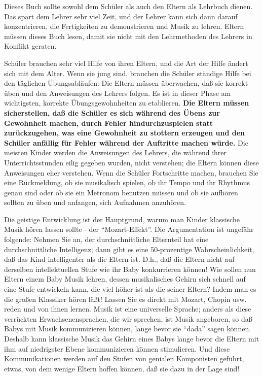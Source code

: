 Dieses Buch sollte sowohl dem Schüler als auch den Eltern als Lehrbuch dienen.
Das spart dem Lehrer sehr viel Zeit, und der Lehrer kann sich dann darauf konzentrieren, die Fertigkeiten zu demonstrieren und Musik zu lehren.
Eltern müssen dieses Buch lesen, damit sie nicht mit den Lehrmethoden des Lehrers in Konflikt geraten.

Schüler brauchen sehr viel Hilfe von ihren Eltern, und die Art der Hilfe ändert sich mit dem Alter.
Wenn sie jung sind, brauchen die Schüler ständige Hilfe bei den täglichen Übungsabläufen: Die Eltern müssen überwachen, daß sie korrekt üben und den Anweisungen des Lehrers folgen.
Es ist in dieser Phase am wichtigsten, korrekte Übungsgewohnheiten zu etablieren.
\textbf{Die Eltern müssen sicherstellen, daß die Schüler es sich während des Übens zur Gewohnheit machen, durch Fehler hindurchzuspielen statt zurückzugehen, was eine Gewohnheit zu stottern erzeugen und den Schüler anfällig für Fehler während der Auftritte machen würde.}
Die meisten Kinder werden die Anweisungen des Lehrers, die während ihrer Unterrichtsstunden eilig gegeben wurden, nicht verstehen; die Eltern können diese Anweisungen eher verstehen.
Wenn die Schüler Fortschritte machen, brauchen Sie eine Rückmeldung, ob sie musikalisch spielen, ob ihr Tempo und ihr Rhythmus genau sind oder ob sie ein Metronom benutzen müssen und ob sie aufhören sollten zu üben und anfangen, sich Aufnahmen anzuhören.

Die geistige Entwicklung ist der Hauptgrund, warum man Kinder klassische Musik hören lassen sollte - der \enquote{Mozart-Effekt}.
Die Argumentation ist ungefähr folgende:
Nehmen Sie an, der durchschnittliche Elternteil hat eine durchschnittliche Intelligenz; dann gibt es eine 50-prozentige Wahrscheinlichkeit, daß das Kind intelligenter als die Eltern ist.
D.h., daß die Eltern nicht auf derselben intellektuellen Stufe wie ihr Baby konkurrieren können!
Wie sollen nun Eltern einem Baby Musik lehren, dessen musikalisches Gehirn sich schnell auf eine Stufe entwickeln kann, die viel höher ist als die seiner Eltern?
Indem man es die großen Klassiker hören läßt!
Lassen Sie es direkt mit Mozart, Chopin usw. reden und von ihnen lernen.
Musik ist eine universelle Sprache; anders als diese verrückten Erwachsenensprachen, die wir sprechen, ist Musik angeboren, so daß Babys mit Musik kommunizieren können, lange bevor sie \enquote{dada} sagen können.
Deshalb kann klassische Musik das Gehirn eines Babys lange bevor die Eltern mit ihm auf niedrigster Ebene kommunizieren können stimulieren.
Und diese Kommunikationen werden auf den Stufen von genialen Komponisten geführt, etwas, von dem wenige Eltern hoffen können, daß sie dazu in der Lage sind!

